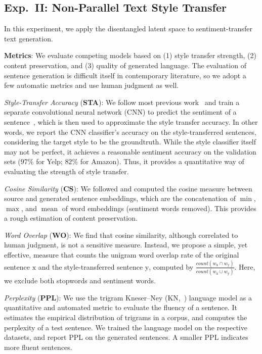 \documentclass[11pt,a4paper]{article}
\begin{document}
\subsection{Exp.~II: Non-Parallel Text Style Transfer}
In this experiment, we apply the disentangled latent space to sentiment-transfer text generation.

\textbf{Metrics}: We evaluate competing models based on (1) style transfer strength, (2) content preservation, and (3) quality of generated language. The evaluation of sentence generation is difficult itself in contemporary literature, so we adopt a few automatic metrics and use human judgment as well.

\textit{Style-Transfer Accuracy} (\textbf{STA}):
We follow most previous work~\cite{hu2017toward,shen2017style,fu2018style} and train a separate convolutional neural network (CNN) to predict the sentiment of a sentence~\cite{kim2014convolutional}, which is then used to approximate the style transfer accuracy.
In other words, we report the CNN classifier's accuracy on the style-transferred sentences, considering the target style to be the groundtruth.
While the style classifier itself may not be perfect, it achieves a reasonable sentiment accuracy on the validation sets ($97\%$ for Yelp; $82\%$ for Amazon).
Thus, it provides a quantitative way of evaluating the strength of style transfer.

\textit{Cosine Similarity} (\textbf{CS}):
We followed \citet{fu2018style} and computed the cosine measure between source and generated sentence embeddings, which are the concatenation of $\operatorname{min}$, $\operatorname{max}$, and $\operatorname{mean}$ of word embeddings (sentiment words removed). This provides a rough estimation of content preservation.

\textit{Word Overlap} (\textbf{WO}):
We find that cosine similarity, although correlated to human judgment, is not a sensitive measure. 
Instead, we propose a simple, yet effective, measure that counts the unigram word overlap rate of the original sentence $\mathrm x$ and the style-transferred sentence $\mathrm y$, computed by $\frac{count(w_{\mathrm x} \cap w_{\mathrm y})}{count(w_{\mathrm x} \cup w_{\mathrm y})}$.
Here, we exclude both stopwords and sentiment words.


\textit{Perplexity} (\textbf{PPL}): We use the trigram Kneser--Ney (KN,~\citeyear{kneser1995improved}) language model as a quantitative and automated metric to evaluate the fluency of a sentence.
It estimates the empirical distribution of trigrams in a corpus, and computes the perplexity of a test sentence.
We trained the language model on the respective datasets, and report PPL on the generated sentences. A smaller PPL indicates more fluent sentences.
\end{document}
